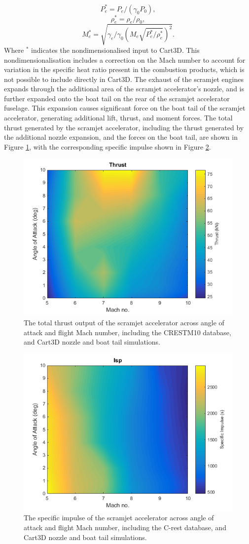 \begin{equation}
P_e^* = P_e/(\gamma_0 P_0),
\end{equation}
\begin{equation}
\rho_e^* = \rho_e/\rho_0,
\end{equation}
\begin{equation}
M_e^* = \sqrt{\gamma_e/\gamma_0 (M_e \sqrt{ P_e^*/\rho_e^*})^2}.
\end{equation}
Where $^*$ indicates the nondimensionalised input to Cart3D. This nondimensionalisation includes a correction on the Mach number to account for variation in the specific heat ratio present in the combustion products, which is not possible to include directly in Cart3D\cite{Mehta2016}. The exhaust of the scramjet engines expands through the additional area of the scramjet accelerator's nozzle, and is further expanded onto the boat tail on the rear of the scramjet accelerator fuselage. This expansion causes significant force on the boat tail of the scramjet accelerator, generating additional lift, thrust, and moment forces. The total thrust generated by the scramjet accelerator, including the thrust generated by the additional nozzle expansion, and the forces on the boat tail, are shown in Figure \ref{fig:Thrust}, with the corresponding specific impulse shown in Figure \ref{fig:Isp}.
\begin{figure}[ht]
	\centering
	\includegraphics[width=0.6\linewidth]{figures/3_vehicle_design/Thrust}
	\caption{The total thrust output of the scramjet accelerator across angle of attack and flight Mach number, including the CRESTM10 database, and Cart3D nozzle and boat tail simulations.}
	\label{fig:Thrust}
\end{figure}
\begin{figure}[ht]
	\centering
	\includegraphics[width=0.6\linewidth]{figures/3_vehicle_design/Isp}
	\caption{The specific impulse of the scramjet accelerator across angle of attack and flight Mach number, including the C-rest database, and Cart3D nozzle and boat tail simulations.}
	\label{fig:Isp}
\end{figure}
